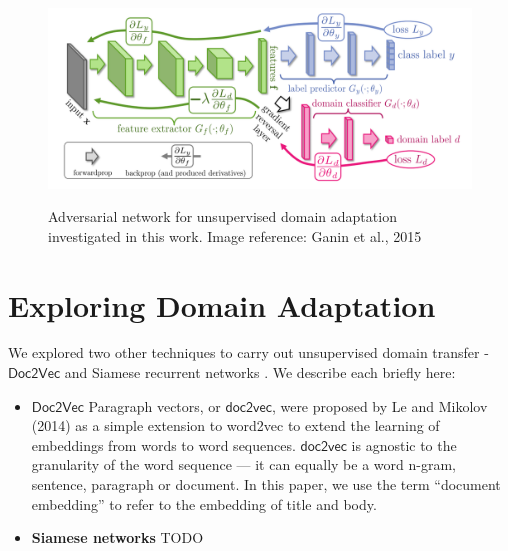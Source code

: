 \documentclass{sigkddExp}
\begin{document}
\begin{figure}[h]
\centering
\includegraphics[width=\columnwidth]{img/adversary.png}
\label{fig:adversary}
\caption{Adversarial network for unsupervised domain adaptation investigated in this work. Image reference: Ganin et al., 2015 \protect\cite{ganin2015unsupervised}}
\end{figure}
 

\section{Exploring Domain Adaptation}
\label{other_techniques}
We explored two other techniques to carry out unsupervised domain transfer - $\textsf{Doc2Vec}$ \cite{doc2vec1} and Siamese recurrent networks \cite{siamese}. We describe each briefly here:

\begin{itemize}[topsep=0pt,itemsep=-1ex,partopsep=1ex,parsep=1ex]
\item $\mathbf{\mathsf{Doc2Vec}}$ Paragraph vectors, or $\mathsf{doc2vec}$, were proposed by Le and Mikolov (2014) as a simple extension to word2vec to extend the learning of embeddings from words to word sequences. $\mathsf{doc2vec}$ is agnostic to the  granularity of the word sequence — it can equally be a word n-gram, sentence, paragraph or document. In this paper, we use the term ``document embedding'' to refer to the embedding of title and body.

\item \textbf{Siamese networks} 
{\color{red} TODO}

\end{itemize}

    
   
\end{document}
